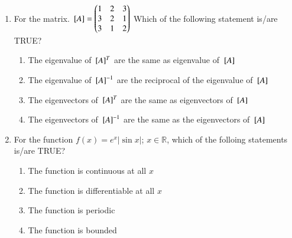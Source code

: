 \documentclass[journal,14pt,onecolumn]{IEEEtran}
\theoremstyle{remark}
\begin{document}
\begin{enumerate}[label={Q\arabic*.}]
\item For the matrix.
\vspace{0.2cm}
${}\left[A\right] = \begin{pmatrix}
    1 & 2 & 3 \\
    3 & 2 & 1 \\
    3 & 1 & 2
\end{pmatrix}$
Which of the following statement is/are TRUE?
\vspace{0.2cm}
\begin{enumerate}
    \item The eigenvalue of ${}\left[A\right]^T$ are the same as eigenvalue of  ${}\left[A\right]$
    \item The eigenvalue of ${}\left[A\right]^{-1}$ are the reciprocal of the eigenvalue of  ${}\left[A\right]$
    \item The eigenvectors of ${}\left[A\right]^T$ are the same as eigenvectors of  ${}\left[A\right]$
    \item The eigenvectors of ${}\left[A\right]^{-1}$ are the same as the eigenvectors of  ${}\left[A\right]$
\end{enumerate}
\vspace{1cm}

\item For the function $f(x)=e^x|\sin{x}|$; $x\in\mathbb{R}$, which of the folloing statements is/are TRUE?
\begin{enumerate}
    \item The function is continuous at all $x$
    \item The function is differentiable at all $x$
    \item The function is periodic
    \item The function is bounded
\end{enumerate}

\newpage


\end{enumerate}
\end{document}
